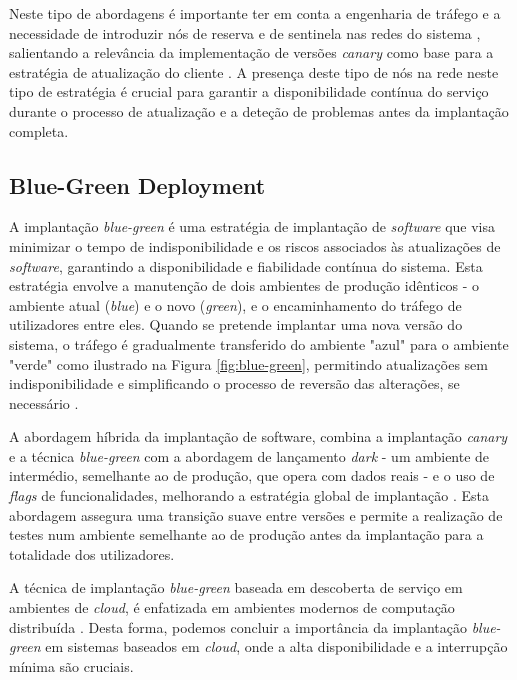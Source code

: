 Neste tipo de abordagens é importante ter em conta a engenharia de tráfego e a necessidade de 
introduzir nós de reserva e de sentinela nas redes do sistema \cite{canary2022}, salientando a 
relevância da implementação de versões \textit{canary} como base para a estratégia de atualização 
do cliente \cite{canary2022}. A presença deste tipo de nós na rede neste tipo de estratégia é 
crucial para garantir a disponibilidade contínua do serviço durante o processo de atualização e a 
deteção de problemas antes da implantação completa.

\subsection{Blue-Green Deployment}

A implantação \textit{blue-green} é uma estratégia de implantação de \textit{software} que visa 
minimizar o tempo de indisponibilidade e os riscos associados às atualizações de \textit{software}, 
garantindo a disponibilidade e fiabilidade contínua do sistema. Esta estratégia envolve a
manutenção de dois ambientes de produção idênticos - o ambiente atual (\textit{blue}) e o novo 
(\textit{green}), e o encaminhamento do tráfego de utilizadores entre eles. Quando se pretende 
implantar uma nova versão do sistema, o tráfego é gradualmente transferido do ambiente "azul" 
para o ambiente "verde" como ilustrado na Figura \ref{fig:blue-green}, permitindo atualizações sem 
indisponibilidade e simplificando o processo de reversão das alterações, se necessário 
\cite{canary2022}.

A abordagem híbrida da implantação de software, combina a implantação \textit{canary} e a técnica 
\textit{blue-green} com a abordagem de lançamento \textit{dark} - um ambiente de intermédio, semelhante
ao de produção, que opera com dados reais - e o uso de \textit{flags} de funcionalidades, 
melhorando a estratégia global de implantação \cite{canary2022}. Esta abordagem assegura uma 
transição suave entre versões e permite a realização de testes num ambiente semelhante ao de 
produção antes da implantação para a totalidade dos utilizadores.

A técnica de implantação \textit{blue-green} baseada em descoberta de serviço em ambientes de 
\textit{cloud}, é enfatizada em ambientes modernos de computação distribuída \cite{bluegreen}. 
Desta forma, podemos concluir a importância da implantação \textit{blue-green} em sistemas baseados 
em \textit{cloud}, onde a alta disponibilidade e a interrupção mínima são cruciais.

